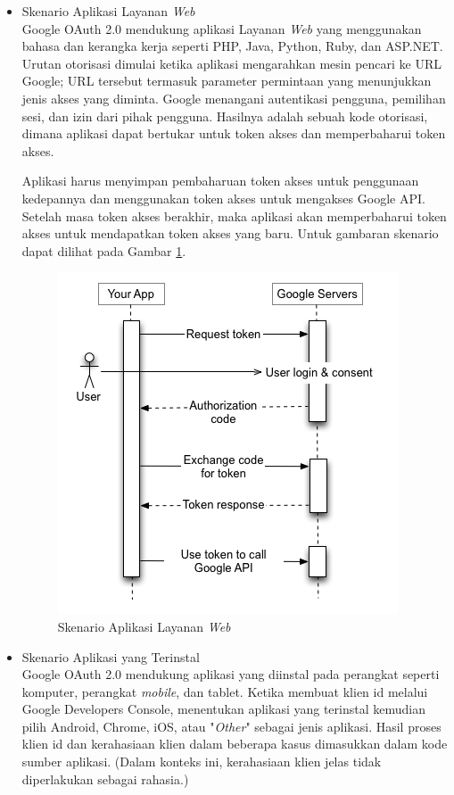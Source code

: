\begin{itemize}
\item Skenario Aplikasi Layanan {\it Web}\\
Google OAuth 2.0 mendukung aplikasi Layanan {\it Web} yang menggunakan bahasa dan kerangka kerja seperti PHP, Java, Python, Ruby, dan ASP.NET. Urutan otorisasi dimulai ketika aplikasi mengarahkan mesin pencari ke URL Google; URL tersebut termasuk parameter permintaan yang menunjukkan jenis akses yang diminta. Google menangani autentikasi pengguna, pemilihan sesi, dan izin dari pihak pengguna. Hasilnya adalah sebuah kode otorisasi, dimana aplikasi dapat bertukar untuk token akses dan memperbaharui token akses.

Aplikasi harus menyimpan pembaharuan token akses untuk penggunaan kedepannya dan menggunakan token akses untuk mengakses Google API. Setelah masa token akses berakhir, maka aplikasi akan memperbaharui token akses untuk mendapatkan token akses yang baru. Untuk gambaran skenario dapat dilihat pada Gambar
\ref{fig:skenarioaplikasiwebserver}.

\begin{figure}[p]
\centering
\includegraphics[scale=1]{Gambar/skenario1.png}
\caption[Skenario Aplikasi Layanan {\it Web}]{Skenario Aplikasi Layanan {\it
Web}}
\label{fig:skenarioaplikasiwebserver}
\end{figure}

\item Skenario Aplikasi yang Terinstal\\
Google OAuth 2.0 mendukung aplikasi yang diinstal pada perangkat seperti komputer, perangkat {\it mobile}, dan tablet. Ketika membuat klien id melalui Google Developers Console, menentukan aplikasi yang terinstal kemudian pilih Android, Chrome, iOS, atau "{\it Other}" sebagai jenis aplikasi. Hasil proses klien id dan kerahasiaan klien dalam beberapa kasus dimasukkan dalam kode sumber aplikasi. (Dalam konteks ini, kerahasiaan klien jelas tidak diperlakukan sebagai rahasia.)


\end{itemize}
